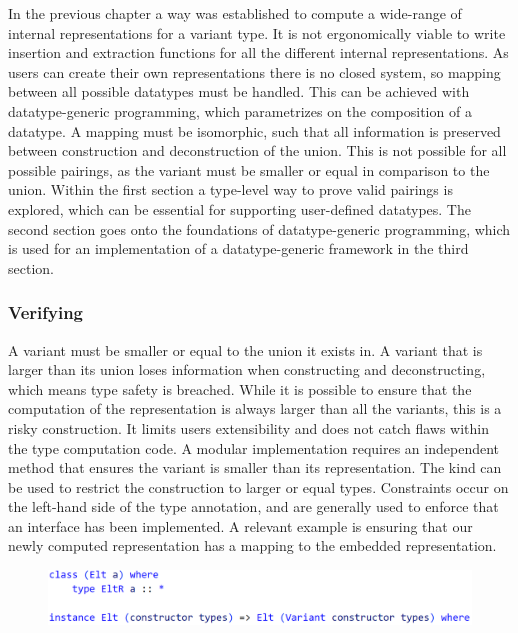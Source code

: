 \documentclass{article}
\newcommand{\type}[1]{\smash{\colorbox{codegray}{\texttt{#1}}}}
\begin{document}
In the previous chapter a way was established to compute a wide-range of internal representations for a variant type.
It is not ergonomically viable to write insertion and extraction functions for all the different internal representations. 
As users can create their own representations there is no closed system, so mapping between all possible datatypes must be handled.
This can be achieved with datatype-generic programming, which parametrizes on the composition of a datatype\cite{datatype-generic-programming}. 
A mapping must be isomorphic, such that all information is preserved between construction and deconstruction of the union.
This is not possible for all possible pairings, as the variant must be smaller or equal in comparison to the union.
Within the first section a type-level way to prove valid pairings is explored, which can be essential for supporting user-defined datatypes.
The second section goes onto the foundations of datatype-generic programming, which is used for an implementation of a datatype-generic framework in the third section.

\subsubsection{Verifying}

A variant must be smaller or equal to the union it exists in.
A variant that is larger than its union loses information when constructing and deconstructing, which means type safety is breached.
While it is possible to ensure that the computation of the representation is always larger than all the variants, this is a risky construction.
It limits users extensibility and does not catch flaws within the type computation code. 
A modular implementation requires an independent method that ensures the variant is smaller than its representation.
The \type{Constraint} kind can be used to restrict the construction to larger or equal types.
Constraints occur on the left-hand side of the type annotation, and are generally used to enforce that an interface has been implemented.
A relevant example is ensuring that our newly computed representation has a mapping to the embedded representation.

\begin{figure}[hbt!]
    \hspace{1em}
    \includegraphics[scale=0.4]{CodeType14.png}
\end{figure}
\end{document}
